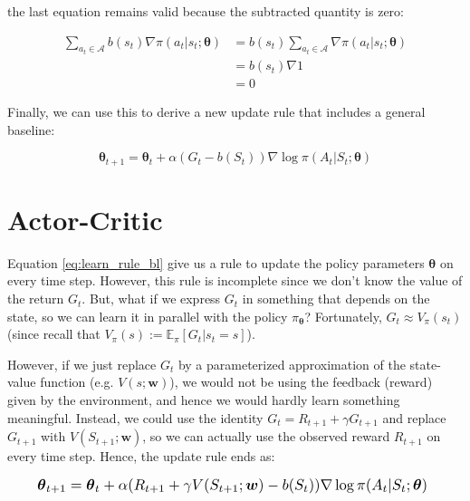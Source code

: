 \documentclass[twoside,twocolumn]{article}
\begin{document}
the last equation remains valid because the subtracted quantity is zero:

\begin{equation*}
  \begin{split}
    \sum_{a_t \in \mathcal{A}} b(s_t) \nabla \pi (a_t|s_t; \boldsymbol{\theta}) &=
    b(s_t) \sum_{a_t \in \mathcal{A}} \nabla \pi (a_t|s_t; \boldsymbol{\theta})\\
    &= b(s_t) \nabla 1 \\
    &= 0
  \end{split}
\end{equation*}

Finally, we can use this to derive a new update rule that includes a general baseline:

\begin{equation}
  \boldsymbol{\theta}_{t+1} = \boldsymbol{\theta}_{t} + \alpha (G_t - b(S_t)) \nabla \log{\pi (A_t|S_t; \boldsymbol{\theta})}
  \label{eq:learn_rule_bl}
\end{equation}


\section{Actor-Critic}

Equation \ref{eq:learn_rule_bl} give us a rule to update the policy parameters $\boldsymbol{\theta}$ on every time step. However, this rule is incomplete since we don't know the value of the return $G_t$. But, what if we express $G_t$ in something that depends on the state, so we can learn it in parallel with the policy $\pi_{\boldsymbol{\theta}}$? Fortunately, $G_t \approx V_{\pi}(s_t)$ (since recall that $V_{\pi}(s):= \mathbb{E}_{\pi}[G_t|s_t=s]$).

However, if we just replace $G_t$ by a parameterized approximation of the state-value function (e.g. $V(s;\boldsymbol{w})$), we would not be using the feedback (reward) given by the environment, and hence we would hardly learn something meaningful. Instead, we could use the identity $G_t = R_{t+1} + \gamma G_{t+1}$ and replace $G_{t+1}$ with $V(S_{t+1};\boldsymbol{w})$, so we can actually use the observed reward $R_{t+1}$ on every time step. Hence, the update rule ends as:

\begin{equation}
  \resizebox{.91\linewidth}{!}{%
  $
    \boldsymbol{\theta}_{t+1} = \boldsymbol{\theta}_{t} + \alpha (R_{t+1} + \gamma V(S_{t+1};\boldsymbol{w}) - b(S_t)) \nabla \log{\pi (A_t|S_t; \boldsymbol{\theta})}
  $
  }
  \label{eq:learn_rule_3}
\end{equation}
\end{document}
